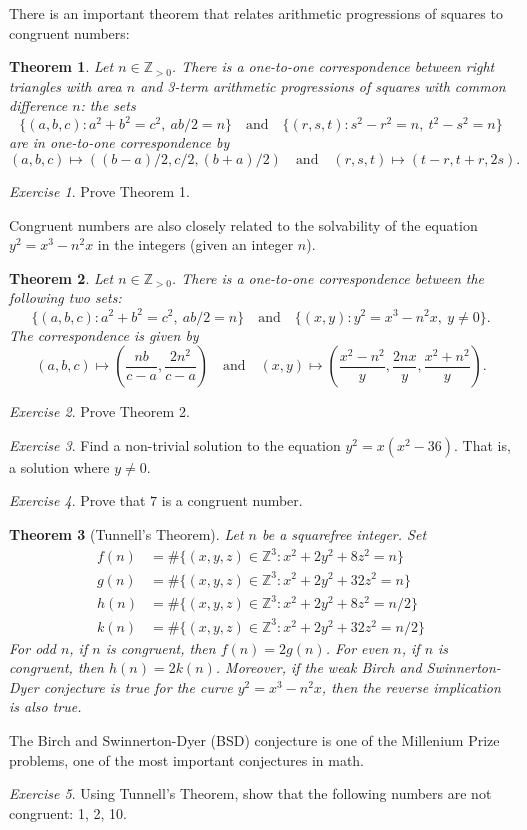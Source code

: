 \documentclass{article}
\newtheorem{theorem}{Theorem}%
\theoremstyle{definition}
\theoremstyle{remark}
\newtheorem{exercise}{Exercise}
\newcommand{\ZZ}{\mathbb{Z}}
\begin{document}
There is an important theorem that relates arithmetic progressions of squares to congruent numbers:

\begin{theorem}
	Let \(n\in\ZZ_{>0}\).
	There is a one-to-one correspondence between right triangles with area \(n\) and 3-term arithmetic progressions of squares with common difference \(n\): the sets
	\[\{(a,b,c):a^2+b^2=c^2,\ ab/2=n\}\quad\text{and}\quad\{(r,s,t):s^2-r^2=n,\ t^2-s^2=n\}\]
	are in one-to-one correspondence by
	\[(a,b,c)\longmapsto((b-a)/2,c/2,(b+a)/2)\quad\text{and}\quad(r,s,t)\longmapsto(t-r,t+r,2s).\]
\end{theorem}

\begin{exercise}
	Prove Theorem 1.
\end{exercise}

Congruent numbers are also closely related to the solvability of the equation \(y^2=x^3-n^2x\) in the integers (given an integer \(n\)).

\begin{theorem}
	Let \(n\in\ZZ_{>0}\).
	There is a one-to-one correspondence between the following two sets:
	\[\{(a,b,c):a^2+b^2=c^2,\ ab/2=n\}\quad\text{and}\quad\{(x,y):y^2=x^3-n^2x,\ y\neq 0\}.\]
	The correspondence is given by 
	\[(a,b,c)\longmapsto\left(\frac{nb}{c-a},\frac{2n^2}{c-a}\right)\quad\text{and}\quad(x,y)\mapsto\left(\frac{x^2-n^2}{y},\frac{2nx}{y},\frac{x^2+n^2}{y}\right).\]
\end{theorem}

\begin{exercise}
	Prove Theorem 2.
\end{exercise}

\begin{exercise}
	Find a non-trivial solution to the equation \(y^2=x(x^2-36)\).
	That is, a solution where \(y\neq 0\).
\end{exercise}

\begin{exercise}
	Prove that \(7\) is a congruent number.
\end{exercise}

\begin{theorem}[Tunnell's Theorem]
	Let \(n\) be a squarefree integer.
	Set
	\begin{align*}
		f(n) &= \#\{(x,y,z)\in\ZZ^3:x^2+2y^2+8z^2=n\}\\
		g(n) &= \#\{(x,y,z)\in\ZZ^3:x^2+2y^2+32z^2=n\}\\
		h(n) &= \#\{(x,y,z)\in\ZZ^3:x^2+2y^2+8z^2=n/2\}\\
		k(n) &= \#\{(x,y,z)\in\ZZ^3:x^2+2y^2+32z^2=n/2\}
	\end{align*}
	For odd \(n\), if \(n\) is congruent, then \(f(n)=2g(n)\).
	For even \(n\), if \(n\) is congruent, then \(h(n)=2k(n)\).
	Moreover, if the weak Birch and Swinnerton-Dyer conjecture is true for the curve \(y^2=x^3-n^2x\), then the reverse implication is also true.
\end{theorem}

The Birch and Swinnerton-Dyer (BSD) conjecture is one of the Millenium Prize problems, one of the most important conjectures in math.

\begin{exercise}
	Using Tunnell's Theorem, show that the following numbers are not congruent: 1, 2, 10.
\end{exercise}
\end{document}
